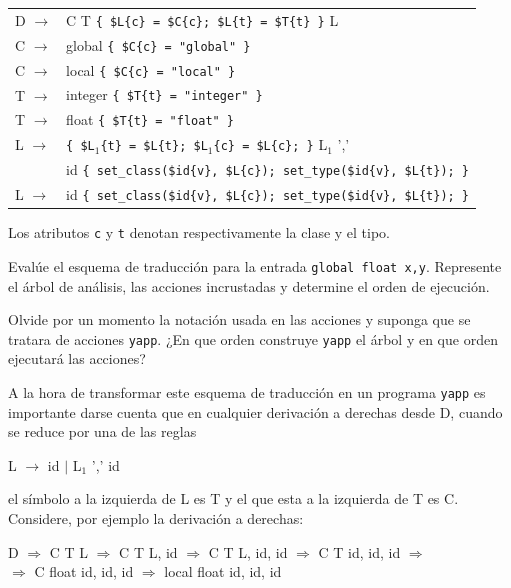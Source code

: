 \vspace{0.5cm}
\begin{center}
\begin{tabular}{|ll|}
\hline
D $\rightarrow$& C T \verb|{ $L{c} = $C{c}; $L{t} = $T{t} }| L\\
C $\rightarrow$& global   \verb|{ $C{c} = "global" }|\\
C $\rightarrow$& local    \verb|{ $C{c} = "local" }|\\
T $\rightarrow$& integer  \verb|{ $T{t} = "integer" }|\\
T $\rightarrow$& float    \verb|{ $T{t} = "float" }|\\
L $\rightarrow$& \verb|{ $L|$_1$\verb|{t} = $L{t}; $L|$_1$\verb|{c} = $L{c}; }| L$_1$ ','\\
               & id \verb|{ set_class($id{v}, $L{c}); set_type($id{v}, $L{t}); }|\\
L $\rightarrow$& id   \verb|{ set_class($id{v}, $L{c}); set_type($id{v}, $L{t}); }|\\
\hline
\end{tabular}
\end{center}
\vspace{0.25cm}

Los atributos \verb|c| y \verb|t| denotan respectivamente
la clase y el tipo. 

\begin{exercise}
Evalúe el esquema de traducción para la entrada
\verb|global float x,y|. Represente el árbol de análisis, las
acciones incrustadas y determine el orden de ejecución.

Olvide por un momento la notación usada en las acciones y 
suponga que se tratara de acciones \verb|yapp|. ¿En que orden
construye \verb|yapp| el árbol y en que orden ejecutará las
acciones?
\end{exercise}

A la hora de transformar este esquema de traducción en un programa
\verb|yapp| es importante darse cuenta que en cualquier derivación a derechas
desde D, cuando se reduce por una de las reglas 

\begin{center}
L $\rightarrow$ id $|$ L$_1$  ',' id
\end{center}

el símbolo a la izquierda de L es T y el que esta a la izquierda de T es C.
Considere, por ejemplo la derivación a derechas:

\begin{center}
D $\Longrightarrow$ C T L $\Longrightarrow$ C T L, id $\Longrightarrow$ C T L, id, id
$\Longrightarrow$ C T id, id, id $\Longrightarrow$ \\
$\Longrightarrow$ C float id, id, id $\Longrightarrow$ local float id, id, id
\end{center}

